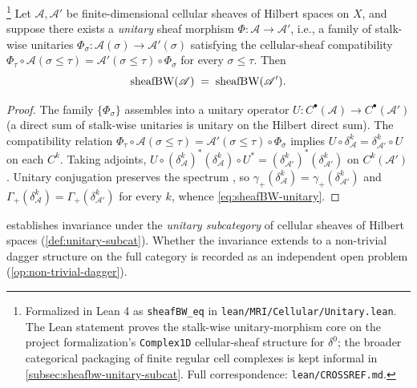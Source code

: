 \begin{proposition}\label{prop:sheafBW-unitary}\footnote{Formalized in Lean 4 as \texttt{sheafBW\_eq} in \texttt{lean/MRI/Cellular/Unitary.lean}. The Lean statement proves the stalk-wise unitary-morphism core on the project formalization's \texttt{Complex1D} cellular-sheaf structure for $\delta^0$; the broader categorical packaging of finite regular cell complexes is kept informal in \cref{subsec:sheafbw-unitary-subcat}. Full correspondence: \texttt{lean/CROSSREF.md}.}
Let $\mathscr{A}, \mathscr{A}'$ be finite-dimensional cellular
sheaves of Hilbert spaces on $X$, and suppose there exists a
\emph{unitary} sheaf morphism $\Phi : \mathscr{A} \to \mathscr{A}'$,
i.e., a family of stalk-wise unitaries
$\Phi_\sigma : \mathscr{A}(\sigma) \to \mathscr{A}'(\sigma)$
satisfying the cellular-sheaf compatibility
$\Phi_\tau \circ \mathscr{A}(\sigma \le \tau) =
\mathscr{A}'(\sigma \le \tau) \circ \Phi_\sigma$ for every $\sigma
\le \tau$. Then
\begin{equation}\label{eq:sheafBW-unitary}
  \operatorname{sheafBW}(\mathscr{A}) \;=\; \operatorname{sheafBW}(\mathscr{A}').
\end{equation}
\end{proposition}

\begin{proof}
The family $\{\Phi_\sigma\}$ assembles into a unitary operator
$U : C^\bullet(\mathscr{A}) \to C^\bullet(\mathscr{A}')$ (a
direct sum of stalk-wise unitaries is unitary on the Hilbert direct
sum). The compatibility relation
$\Phi_\tau \circ \mathscr{A}(\sigma \le \tau) =
\mathscr{A}'(\sigma \le \tau) \circ \Phi_\sigma$ implies
$U \circ \delta^k_{\mathscr{A}} = \delta^k_{\mathscr{A}'} \circ U$ on
each $C^k$. Taking adjoints,
$U \circ (\delta^k_{\mathscr{A}})^* (\delta^k_{\mathscr{A}}) \circ U^* =
(\delta^k_{\mathscr{A}'})^* (\delta^k_{\mathscr{A}'})$ on
$C^k(\mathscr{A}')$. Unitary conjugation preserves the spectrum
\cite[\S VI.1]{ReedSimonI}, so
$\gamma_+(\delta^k_{\mathscr{A}}) =
\gamma_+(\delta^k_{\mathscr{A}'})$ and
$\Gamma_+(\delta^k_{\mathscr{A}}) =
\Gamma_+(\delta^k_{\mathscr{A}'})$ for every $k$, whence
\cref{eq:sheafBW-unitary}.
\end{proof}

\begin{remark}\label{rem:sheafbw-extent}
 establishes invariance under the
\emph{unitary subcategory} of cellular sheaves of Hilbert spaces
(\cref{def:unitary-subcat}). Whether the invariance extends to a
non-trivial dagger structure on the full category is recorded as an
independent open problem (\cref{op:non-trivial-dagger}).
\end{remark}

